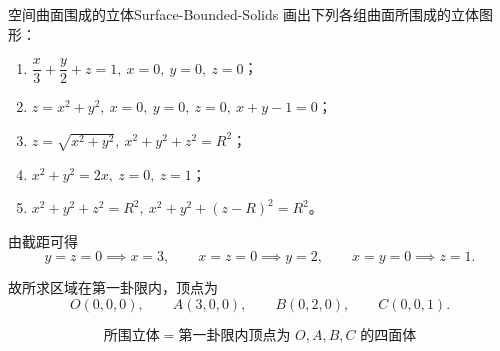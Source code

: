 \begin{problem}{空间曲面围成的立体}{Surface-Bounded-Solids}
    画出下列各组曲面所围成的立体图形：
    \begin{enumerate}
        \item $\dfrac{x}{3}+\dfrac{y}{2}+z=1,\ x=0,\ y=0,\ z=0$；
        \item $z=x^2+y^2,\ x=0,\ y=0,\ z=0,\ x+y-1=0$；
        \item $z=\sqrt{x^2+y^2},\ x^2+y^2+z^2=R^2$；
        \item $x^2+y^2=2x,\ z=0,\ z=1$；
        \item $x^2+y^2+z^2=R^2,\ x^2+y^2+(z-R)^2=R^2$。
    \end{enumerate}
\end{problem}

\begin{solution}

    由截距可得
    \begin{equation}
        y=z=0 \implies x=3,\qquad x=z=0 \implies y=2,\qquad x=y=0 \implies z=1.
    \end{equation}

    故所求区域在第一卦限内，顶点为
    \begin{equation}
        O(0,0,0),\qquad A(3,0,0),\qquad B(0,2,0),\qquad C(0,0,1).
    \end{equation}

    \begin{center}
    \end{center}

    \begin{equation}
        \boxed{\text{所围立体}= \text{第一卦限内顶点为 }O,A,B,C\text{ 的四面体}}
    \end{equation}


\end{solution}
